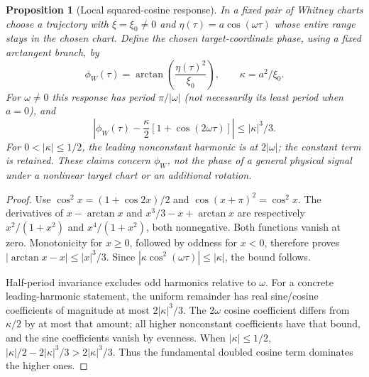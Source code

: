\documentclass[11pt,a4paper]{article}
\newtheorem{proposition}[theorem]{Proposition}
\theoremstyle{definition}\newtheorem{definition}[theorem]{Definition}
\theoremstyle{remark}\newtheorem{remark}[theorem]{Remark}
\begin{document}
\begin{proposition}[Local squared-cosine response]\label{prop:response}
In a fixed pair of Whitney charts choose a trajectory with
$\xi=\xi_0\ne0$ and $\eta(\tau)=a\cos(\omega\tau)$ whose entire
range stays in the chosen chart. Define the chosen target-coordinate
phase, using a fixed arctangent branch, by
\[
 \phi_W(\tau)=\arctan\left(\frac{\eta(\tau)^2}{\xi_0}\right),\qquad
 \kappa=a^2/\xi_0.
\]
For $\omega\ne0$ this response has period $\pi/|\omega|$ (not
necessarily its least period when $a=0$), and
\begin{equation}\label{eq:response-bound}
 \left|\phi_W(\tau)-\frac\kappa2[1+\cos(2\omega\tau)]\right|
       \leq |\kappa|^3/3.
\end{equation}
For $0<|\kappa|\leq1/2$, the leading nonconstant harmonic is at
$2|\omega|$; the constant term is retained. These claims concern
$\phi_W$, not the phase of a general physical signal under a nonlinear
target chart or an additional rotation.
\end{proposition}
\begin{proof}
Use $\cos^2 x=(1+\cos2x)/2$ and
$\cos(x+\pi)^2=\cos^2x$. The derivatives of
$x-\arctan x$ and $x^3/3-x+\arctan x$ are respectively
$x^2/(1+x^2)$ and $x^4/(1+x^2)$, both nonnegative.
Both functions vanish at zero. Monotonicity for $x\geq0$, followed by
oddness for $x<0$, therefore proves
$|\arctan x-x|\leq |x|^3/3$.
Since $|\kappa\cos^2(\omega\tau)|\leq|\kappa|$, the bound follows.

Half-period invariance excludes odd harmonics relative to $\omega$.
For a concrete leading-harmonic statement, the uniform remainder has
real sine/cosine coefficients of magnitude at most $2|\kappa|^3/3$.
The $2\omega$ cosine coefficient differs from $\kappa/2$ by at most
that amount; all higher nonconstant coefficients have that bound, and
the sine coefficients vanish by evenness. When $|\kappa|\leq1/2$,
$|\kappa|/2-2|\kappa|^3/3>2|\kappa|^3/3$.
Thus the fundamental doubled cosine term dominates the higher ones.
\end{proof}
\end{document}
